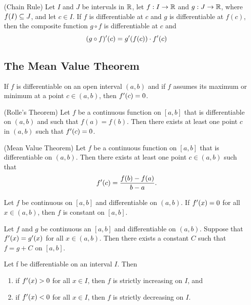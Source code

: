\documentclass[12pt]{article}
\begin{document}
\begin{theorem}
(Chain Rule) Let $I$ and $J$ be intervals in $\mathbb{R}$, let $f : I \rightarrow \mathbb{R}$ and
$g : J \rightarrow \mathbb{R}$, where $f(I) \subseteq J$, and let $c \in I$. If $f$ is differentiable
at $c$ and $g$ is differentiable at $f(c)$, then the composite function $g \circ f$ is
differentiable at $c$ and $$(g \circ f)'(c) = g'(f(c)) \cdot f'(c)$$
\end{theorem}

\subsection{The Mean Value Theorem}
\label{sec:org4be3939}
\begin{theorem}
  If $f$ is differentiable on an open interval $(a,b)$ and if $f$ assumes its
  maximum or minimum at a point $c \in (a,b)$, then $f'(c) = 0$.
\end{theorem}

\begin{theorem}
  (Rolle's Theorem) Let $f$ be a continuous function on $[a,b]$ that is
  differentiable on $(a,b)$ and such that $f(a) = f(b)$. Then there exists at
  least one point $c$ in $(a,b)$ such that $f'(c) = 0$.
\end{theorem}

\begin{theorem}
  (Mean Value Theorem) Let $f$ be a continuous function on $[a,b]$ that is
  differentiable on $(a,b)$. Then there exists at least one point $c \in (a,b)$
  such that $$f'(c) = \frac{f(b) - f(a)}{b - a}.$$
\end{theorem}

\begin{theorem}
  Let $f$ be continuous on $[a,b]$ and differentiable on $(a,b)$. If $f'(x)
  = 0$ for all $x \in (a,b)$, then $f$ is constant on $[a,b]$.
\end{theorem}

\begin{corollary}
  Let $f$ and $g$ be continuous an $[a,b]$ and differentiable on $(a,b)$.
  Suppose that $f'(x) = g'(x)$ for all $x \in (a,b)$. Then there exists a
  constant $C$ such that $f = g + C$ on $[a,b]$.
\end{corollary}

\begin{theorem}
  Let f be differentiable on an interval $I$. Then 
  \begin{enumerate}
  \item if $f'(x) > 0$ for all $x \in I$, then $f$ is strictly increasing on
    $I$, and
  \item if $f'(x) < 0$ for all $x \in I$, then $f$ is strictly decreasing on
    $I$.
  \end{enumerate}
\end{theorem}
\end{document}
